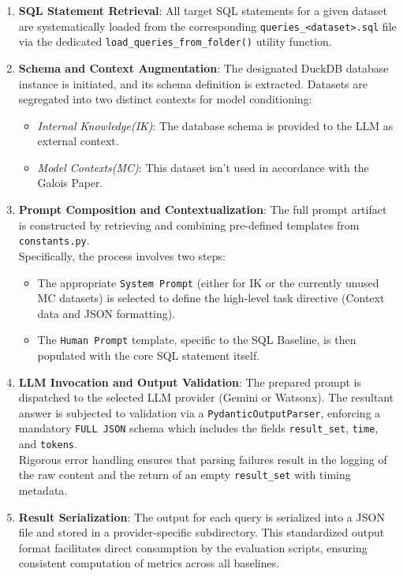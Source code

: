 \begin{enumerate}[leftmargin=*, label=\arabic*.]
    \item \textbf{SQL Statement Retrieval}: All target SQL statements for a given dataset are systematically loaded from the corresponding \texttt{queries\_\textless dataset\textgreater{}.sql} file via the dedicated \texttt{load\_queries\_from\_folder()} utility function.

    \item \textbf{Schema and Context Augmentation}: The designated DuckDB database instance is initiated, and its schema definition is extracted. Datasets are segregated into two distinct contexts for model conditioning:
    \begin{itemize}[leftmargin=1.5em] 
        \item \emph{Internal Knowledge(IK)}: The database schema is provided to the LLM as external context.
        \item \emph{Model Contexts(MC)}: This dataset isn't used in accordance with the Galois Paper.
    \end{itemize}

    \item \textbf{Prompt Composition and Contextualization}: The full prompt artifact is constructed by retrieving and combining pre-defined templates from \texttt{constants.py}. \\
    Specifically, the process involves two steps:
    \begin{itemize}[leftmargin=1.5em]
        \item The appropriate \texttt{System Prompt} (either for IK or the currently unused MC datasets) is selected to define the high-level task directive (Context data and JSON formatting).
        \item The \texttt{Human Prompt} template, specific to the SQL Baseline, is then populated with the core SQL statement itself.
    \end{itemize}

    \item \textbf{LLM Invocation and Output Validation}: The prepared prompt is dispatched to the selected LLM provider (Gemini or Watsonx). The resultant answer is subjected to validation via a \texttt{PydanticOutputParser}, enforcing a mandatory \texttt{FULL JSON} schema which includes the fields \texttt{result\_set}, \texttt{time}, and \texttt{tokens}. \\
    Rigorous error handling ensures that parsing failures result in the logging of the raw content and the return of an empty \texttt{result\_set} with timing metadata.

    \item \textbf{Result Serialization}: The output for each query is serialized into a JSON file and stored in a provider-specific subdirectory. This standardized output format facilitates direct consumption by the evaluation scripts, ensuring consistent computation of metrics across all baselines.
\end{enumerate}

